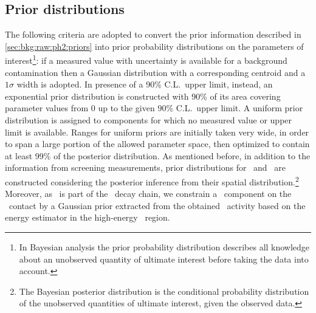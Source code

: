 \subsection{Prior distributions}

The following criteria are adopted to convert the prior information described in
\cref{sec:bkg:raw:ph2:priors} into prior probability distributions on the parameters of
interest\footnote{In Bayesian analysis the prior probability distribution describes all
  knowledge about an unobserved quantity of ultimate interest before taking the data into
account.}: if a measured value with uncertainty is available for a background
contamination then a Gaussian distribution with a corresponding centroid and a $1\sigma$
width is adopted. In presence of a 90\% C.L.~upper limit, instead, an exponential prior
distribution is constructed with 90\% of its area covering parameter values from 0 up to
the given 90\% C.L.~upper limit. A uniform prior distribution is assigned to components
for which no measured value or upper limit is available. Ranges for uniform priors are
initially taken very wide, in order to span a large portion of the allowed parameter
space, then optimized to contain at least 99\% of the posterior distribution. As mentioned
before, in addition to the information from screening measurements, prior distributions
for \kvn\ and \kvz\ are constructed considering the posterior inference from their spatial
distribution.\footnote{The Bayesian posterior distribution is the conditional probability
  distribution of the unobserved quantities of ultimate interest, given the observed
data.} Moreover, as \Bih\ is part of the \Ra\ decay chain, we constrain a \Bih\ component
on the \pplus\ contact by a Gaussian prior extracted from the obtained \Ra\ activity based
on the energy estimator in the high-energy \a\ region.

